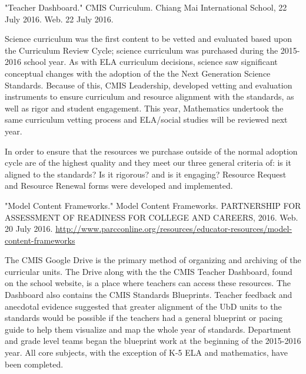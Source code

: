 \documentclass{report}
\begin{document}
\begin{evidence}
\item "Teacher Dashboard." CMIS Curriculum. Chiang Mai International School, 22 July 2016. Web. 22 July 2016.
\end{evidence}

\begin{findings}
Science curriculum was the first content to be vetted and evaluated based upon the Curriculum Review Cycle; science curriculum was purchased during the 2015-2016 school year. As with ELA curriculum decisions, science saw significant conceptual changes with the adoption of the the Next Generation Science Standards. Because of this, CMIS Leadership, developed vetting and evaluation instruments to ensure curriculum and resource alignment with the standards, as well as rigor and student engagement. This year, Mathematics undertook the same curriculum vetting process and ELA/social studies will be reviewed next year. 

In order to ensure that the resources we purchase outside of the normal adoption cycle are of the highest quality and they meet our three general criteria of: is it aligned to the standards? Is it rigorous? and is it engaging? Resource Request and Resource Renewal forms were developed and implemented. 
\end{findings}

\begin{evidence}
\item "Model Content Frameworks." Model Content Frameworks. PARTNERSHIP FOR ASSESSMENT OF READINESS FOR COLLEGE AND CAREERS, 2016. Web. 20 July 2016. \url{http://www.parcconline.org/resources/educator-resources/model-content-frameworks}
\end{evidence}

\begin{findings}
The CMIS Google Drive is the primary method of organizing and archiving  of the curricular units. The Drive along with the the CMIS Teacher Dashboard, found on the school website, is a place where teachers can access these resources. The Dashboard also contains the CMIS Standards Blueprints. Teacher feedback and anecdotal evidence suggested that greater alignment of the UbD units to the standards would be possible if the teachers had a general blueprint or pacing guide to help them visualize and map the whole year of standards. Department and grade level teams began the blueprint work at the beginning of the 2015-2016 year. All core subjects, with the exception of K-5 ELA and mathematics, have been completed. 
\end{findings}
\end{document}

